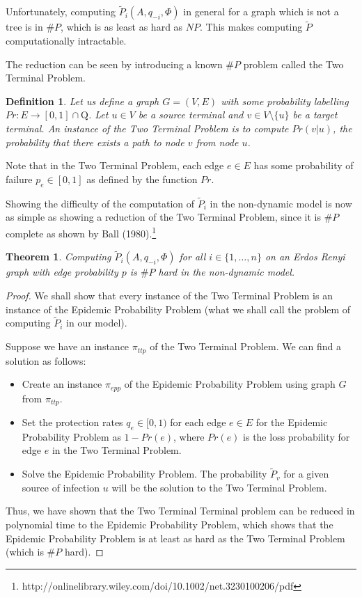 \documentclass{article}
\theoremstyle{plain}
\newtheorem{definition}{Definition}
\newtheorem{theorem}{Theorem}
\begin{document}
Unfortunately, computing $\tilde{P}_i(A, q_{-i}, \Phi)$ in general for a graph which is not a tree is in $\# P$, which is as least as hard as $NP$. This makes computing $\tilde{P}$ computationally intractable.

The reduction can be seen by introducing a known $\# P$ problem called the Two Terminal Problem.

\begin{definition}
  Let us define a graph $G = (V, E)$ with some probability labelling $Pr: E \to [0,1] \cap \mathrm{Q}$. Let $u \in V$ be a source terminal and $v \in V \setminus \{u\}$ be a target terminal. An instance of the \emph{Two Terminal Problem} is to compute $Pr(v | u)$, the probability that there exists a path to node $v$ from node $u$.
\end{definition}

Note that in the Two Terminal Problem, each edge $e \in E$ has some probability of failure $p_e \in [0,1]$ as defined by the function $Pr$.

Showing the difficulty of the computation of $\tilde{P}_i$ in the non-dynamic model is now as simple as showing a reduction of the Two Terminal Problem, since it is $\# P$ complete as shown by Ball (1980).\footnote{http://onlinelibrary.wiley.com/doi/10.1002/net.3230100206/pdf}

\begin{theorem}
  Computing $\tilde{P}_i(A, q_{-i}, \Phi)$ for all $i \in \{1, \ldots, n\}$ on an Erdos Renyi graph with edge probability $p$ is $\# P$ hard in the non-dynamic model.
\end{theorem}
\begin{proof}
  We shall show that every instance of the Two Terminal Problem is an instance of the Epidemic Probability Problem (what we shall call the problem of computing $\tilde{P}_i$ in our model).

  Suppose we have an instance $\pi_{ttp}$ of the Two Terminal Problem. We can find a solution as follows:
  \begin{itemize}
    \item Create an instance $\pi_{epp}$ of the Epidemic Probability Problem using graph $G$ from $\pi_{ttp}$.
    \item Set the protection rates $q_e \in [0,1)$ for each edge $e \in E$ for the Epidemic Probability Problem as $1 - Pr(e)$, where $Pr(e)$ is the loss probability for edge $e$ in the Two Terminal Problem.
    \item Solve the Epidemic Probability Problem. The probability $\tilde{P}_v$ for a given source of infection $u$ will be the solution to the Two Terminal Problem.
  \end{itemize}

  Thus, we have shown that the Two Terminal Terminal problem can be reduced in polynomial time to the Epidemic Probability Problem, which shows that the Epidemic Probability Problem is at least as hard as the Two Terminal Problem (which is $\# P$ hard).
\end{proof}
\end{document}
